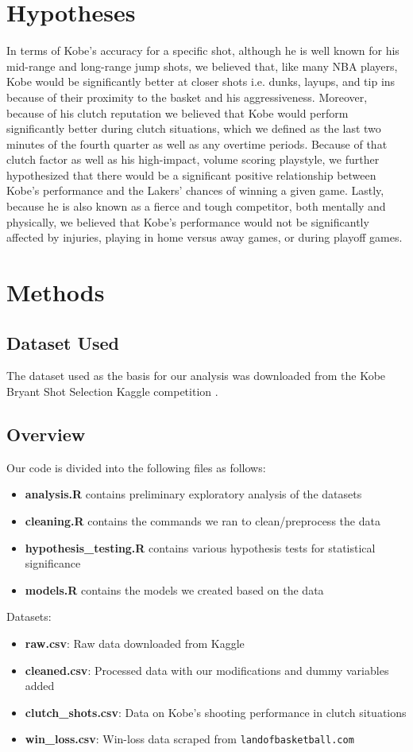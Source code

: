 \documentclass[paper=a4, fontsize=11pt]{scrartcl} %
\numberwithin{equation}{section} %
\numberwithin{figure}{section} %
\numberwithin{table}{section} %
\begin{document}
\section{Hypotheses}
\hspace*{1cm}In terms of Kobe's accuracy for a specific shot, although he is well known for his mid-range and long-range jump shots, we believed that, like many NBA players, Kobe would be significantly better at closer shots i.e. dunks, layups, and tip ins because of their proximity to the basket and his aggressiveness. Moreover, because of his clutch reputation we believed that Kobe would perform significantly better during clutch situations, which we defined as the last two minutes of the fourth quarter as well as any overtime periods. Because of that clutch factor as well as his high-impact, volume scoring playstyle, we further hypothesized that there would be a significant positive relationship between Kobe's performance and the Lakers' chances of winning a given game. Lastly, because he is also known as a fierce and tough competitor, both mentally and physically, we believed that Kobe's performance would not be significantly affected by injuries, playing in home versus away games, or during playoff games.
\section{Methods}
	\subsection{Dataset Used}
	\hspace*{1cm}The dataset used as the basis for our analysis was downloaded from the Kobe Bryant Shot Selection Kaggle competition \cite{kagglecompetition}.
	\subsection{Overview}
	Our code is divided into the following files as follows:
		\begin{itemize}
			\item \textbf{analysis.R} contains preliminary exploratory analysis of the datasets
			\item \textbf{cleaning.R} contains the commands we ran to clean/preprocess the data
			\item \textbf{hypothesis\_testing.R} contains various hypothesis tests for statistical significance
			\item \textbf{models.R} contains the models we created based on the data
		\end{itemize}
	Datasets:
		\begin{itemize}
			\item \textbf{raw.csv}: Raw data downloaded from Kaggle
			\item \textbf{cleaned.csv}: Processed data with our modifications and dummy variables added
			\item \textbf{clutch\_shots.csv}: Data on Kobe's shooting performance in clutch situations
			\item \textbf{win\_loss.csv}: Win-loss data scraped from \texttt{landofbasketball.com}
		\end{itemize}
\end{document}
